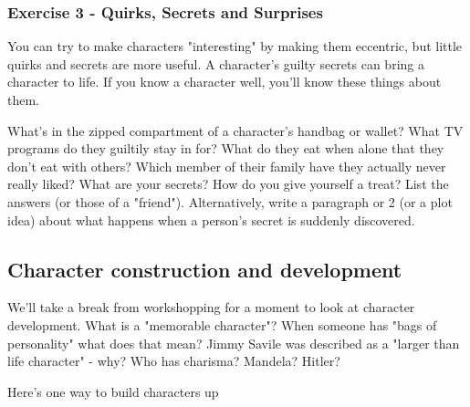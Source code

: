 \documentclass[11pt]{article}
\newenvironment{narrow}[2]{%
 \begin{list}{}{%
  \setlength{\topsep}{0pt}%
  \setlength{\leftmargin}{#1}%
  \setlength{\rightmargin}{#2}%
  \setlength{\listparindent}{\parindent}%
  \setlength{\itemindent}{\parindent}%
  \setlength{\parsep}{\parskip}%
 }%
\item[]}{\end{list}}
\begin{document}
\subsubsection*{Exercise 3 - Quirks, Secrets and Surprises}
You can try to make characters "interesting" by making them eccentric, but little quirks and secrets are more useful. 
A character's guilty secrets can bring a character to life. If you know a character well, you'll know these things about them.


\begin{narrow}{1.0cm}{1.0cm}
What's in the zipped compartment of a character's handbag or wallet? What TV 
programs do they guiltily stay in for? What do they eat when alone that they 
don't eat with others? Which member of their family have they actually never 
really liked? What are your secrets?  How do you give yourself a treat? List 
the answers (or those of a "friend"). Alternatively, write a paragraph or 2 
(or a plot idea) about what happens when a person's secret is suddenly discovered.
\end{narrow}

\subsection*{Character construction and development}
We'll take a break from workshopping for a moment to look at character development. What is a "memorable character"? When someone has "bags of personality" what does that mean? Jimmy Savile was described as a "larger than life character" - why? Who has charisma? Mandela? Hitler?


Here's one way to build characters up
\end{document}
